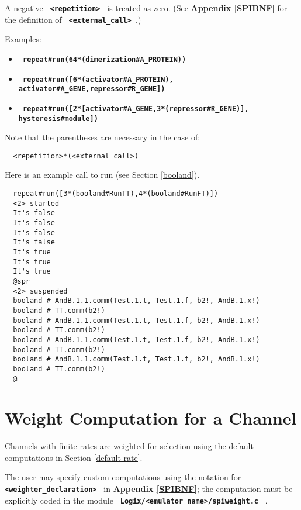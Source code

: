 \documentclass[twoside,10pt]{report}
\begin{document}
\noindent
A negative {\bf \verb+ <repetition> +} is treated as zero.
\noindent
(See {\bf Appendix \ref{SPIBNF}} for the definition of {\bf \verb+ <external_call> +}.)

\noindent
Examples:

\begin{itemize}
\item
{\bf \verb+ repeat#run(64*(dimerization#A_PROTEIN)) +}
\item
{\bf \verb+ repeat#run([6*(activator#A_PROTEIN), +} \linebreak
{\bf \verb+             activator#A_GENE,repressor#R_GENE]) +}
\item
{\bf \verb+ repeat#run([2*[activator#A_GENE,3*(repressor#R_GENE)], +} \linebreak
{\bf \verb+             hysteresis#module]) +}
\end{itemize}

\noindent
Note that the parentheses are necessary in the case of:

\begin{verbatim}
  <repetition>*(<external_call>)
\end{verbatim}

\noindent
Here is an example call to run (see Section \ref{booland}).

\begin{verbatim}
  repeat#run([3*(booland#RunTT),4*(booland#RunFT)]) 
  <2> started
  It's false
  It's false
  It's false
  It's false
  It's true
  It's true
  It's true
  @spr
  <2> suspended
  booland # AndB.1.1.comm(Test.1.t, Test.1.f, b2!, AndB.1.x!)
  booland # TT.comm(b2!)
  booland # AndB.1.1.comm(Test.1.t, Test.1.f, b2!, AndB.1.x!)
  booland # TT.comm(b2!)
  booland # AndB.1.1.comm(Test.1.t, Test.1.f, b2!, AndB.1.x!)
  booland # TT.comm(b2!)
  booland # AndB.1.1.comm(Test.1.t, Test.1.f, b2!, AndB.1.x!)
  booland # TT.comm(b2!)
  @
\end{verbatim}

\section{Weight Computation for a Channel}
Channels with finite rates are weighted for selection using the
default computations in Section \ref{default rate}.

\noindent
The user may specify custom computations using the notation for \linebreak
{\bf \verb+ <weighter_declaration> +}
in {\bf Appendix \ref{SPIBNF}}; the computation must be explicitly coded in
the module {\bf \verb+ Logix/<emulator name>/spiweight.c +} .
\end{document}
